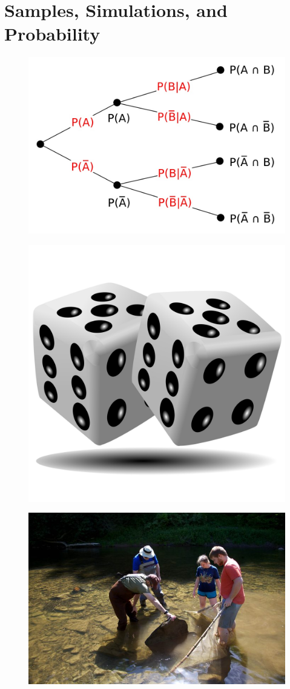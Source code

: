\documentclass[
]{book}
\theoremstyle{definition}
\theoremstyle{definition}
\theoremstyle{definition}
\theoremstyle{definition}
\theoremstyle{remark}
\begin{document}
\hypertarget{simulations}{%
\chapter{Samples, Simulations, and Probability}\label{simulations}}

\begin{figure}

{\centering \includegraphics[width=0.6\linewidth]{images/Probability_tree_diagram} 

}

\end{figure}

\begin{figure}

{\centering \includegraphics[width=0.2\linewidth]{images/dice-1509741828tXY} 

}

\end{figure}

\begin{figure}

{\centering \includegraphics[width=0.5\linewidth]{images/PIXNIO-54228-725x483} 

}

\end{figure}
\end{document}

